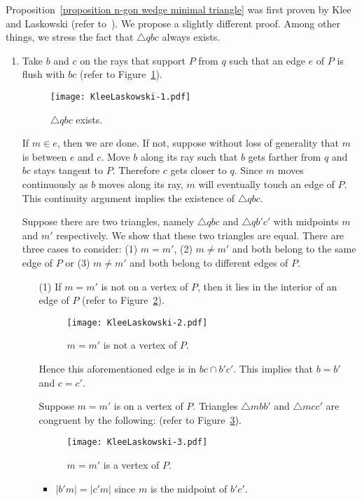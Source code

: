 \documentclass[11pt, oneside]{article}
\begin{document}
Proposition~\ref{proposition n-gon wedge minimal triangle}
was first proven by Klee and Laskowski
(refer to~\cite[Lemma~1.2]{DBLP:journals/jal/KleeL85}).
We propose a slightly different proof.
Among other things,
we stress the fact that $\triangle qbc$ always exists.
\proof\
\begin{enumerate}
\item Take $b$ and $c$ on the rays that support $P$ from $q$
such that an edge $e$ of $P$ is flush with $bc$
(refer to Figure~\ref{figure KleeLaskowski-1}).
\begin{figure}
\centering
\texttt{[image: KleeLaskowski-1.pdf]}
\caption{$\triangle qbc$ exists.\label{figure KleeLaskowski-1}}
\end{figure}
If $m\in e$, 
then we are done.
If not,
suppose without loss of generality
that $m$ is between $e$ and $c$.
Move $b$ along its ray such that
$b$ gets farther from $q$ 
and $bc$ stays tangent to $P$.
Therefore $c$ gets closer to $q$.
Since $m$ moves continuously
as $b$ moves along its ray,
$m$ will eventually touch an edge of $P$.
This continuity argument implies the existence of $\triangle qbc$.

Suppose there are two triangles,
namely $\triangle qbc$ and $\triangle qb'c'$
with midpoints $m$ and $m'$ respectively.
We show that these two triangles are equal.
There are three cases to consider:
(1) $m = m'$,
(2) $m \neq m'$ and both belong to the same edge of $P$
or (3) $m \neq m'$ and both belong to different edges of $P$.

\begin{enumerate}
\item[(1)]
If $m = m'$ is not on a vertex of $P$,
then it lies in the interior of an edge of $P$
(refer to Figure~\ref{figure KleeLaskowski-2}).
\begin{figure}
\centering
\texttt{[image: KleeLaskowski-2.pdf]}
\caption{$m=m'$ is not a vertex of $P$.\label{figure KleeLaskowski-2}}
\end{figure}
Hence this aforementioned edge is in $bc \cap b'c'$.
This implies that $b=b'$ and $c=c'$.

Suppose $m = m'$ is on a vertex of $P$.
Triangles $\triangle mbb'$ and $\triangle mcc'$ are congruent by the following:
(refer to Figure~\ref{figure KleeLaskowski-3}).
\begin{figure}
\centering
\texttt{[image: KleeLaskowski-3.pdf]}
\caption{$m=m'$ is a vertex of $P$.\label{figure KleeLaskowski-3}}
\end{figure}
\begin{itemize}
\item $|b'm| = |c'm|$ since $m$ is the midpoint of $b'c'$.


\end{itemize}
\end{enumerate}
\end{enumerate}
\end{document}
